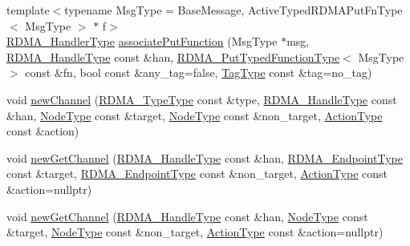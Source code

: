 \begin{DoxyCompactItemize}
\item 
{\footnotesize template$<$typename Msg\+Type  = Base\+Message, Active\+Typed\+R\+D\+M\+A\+Put\+Fn\+Type$<$ Msg\+Type $>$ $\ast$ f$>$ }\\\hyperlink{namespacevt_a9530efb893c0f3846e8ac5f0507e0f49}{R\+D\+M\+A\+\_\+\+Handler\+Type} \hyperlink{structvt_1_1rdma_1_1_r_d_m_a_manager_a5092afb73c1a6fb69cb211f23eb704cb}{associate\+Put\+Function} (Msg\+Type $\ast$msg, \hyperlink{namespacevt_a10442579ec4e7ebef223818e64bcf908}{R\+D\+M\+A\+\_\+\+Handle\+Type} const \&han, \hyperlink{structvt_1_1rdma_1_1_r_d_m_a_manager_ad9746ec3367968e16945ef88c1ac45ce}{R\+D\+M\+A\+\_\+\+Put\+Typed\+Function\+Type}$<$ Msg\+Type $>$ const \&fn, bool const \&any\+\_\+tag=false, \hyperlink{namespacevt_a84ab281dae04a52a4b243d6bf62d0e52}{Tag\+Type} const \&tag=no\+\_\+tag)
\item 
void \hyperlink{structvt_1_1rdma_1_1_r_d_m_a_manager_add2a57acf8b38758b2e53f71d92d452a}{new\+Channel} (\hyperlink{namespacevt_1_1rdma_ac848e1d9da43db6294bd06f83e5d3946}{R\+D\+M\+A\+\_\+\+Type\+Type} const \&type, \hyperlink{namespacevt_a10442579ec4e7ebef223818e64bcf908}{R\+D\+M\+A\+\_\+\+Handle\+Type} const \&han, \hyperlink{namespacevt_a866da9d0efc19c0a1ce79e9e492f47e2}{Node\+Type} const \&target, \hyperlink{namespacevt_a866da9d0efc19c0a1ce79e9e492f47e2}{Node\+Type} const \&non\+\_\+target, \hyperlink{namespacevt_ae0a5a7b18cc99d7b732cb4d44f46b0f3}{Action\+Type} const \&action)
\item 
void \hyperlink{structvt_1_1rdma_1_1_r_d_m_a_manager_af300aa329bab5b4fe851025525659454}{new\+Get\+Channel} (\hyperlink{namespacevt_a10442579ec4e7ebef223818e64bcf908}{R\+D\+M\+A\+\_\+\+Handle\+Type} const \&han, \hyperlink{structvt_1_1rdma_1_1_r_d_m_a_manager_a106350721a187d2cfb94a9017ef66a07}{R\+D\+M\+A\+\_\+\+Endpoint\+Type} const \&target, \hyperlink{structvt_1_1rdma_1_1_r_d_m_a_manager_a106350721a187d2cfb94a9017ef66a07}{R\+D\+M\+A\+\_\+\+Endpoint\+Type} const \&non\+\_\+target, \hyperlink{namespacevt_ae0a5a7b18cc99d7b732cb4d44f46b0f3}{Action\+Type} const \&action=nullptr)
\item 
void \hyperlink{structvt_1_1rdma_1_1_r_d_m_a_manager_a6a3ecf9512915681304ccd0126ec531f}{new\+Get\+Channel} (\hyperlink{namespacevt_a10442579ec4e7ebef223818e64bcf908}{R\+D\+M\+A\+\_\+\+Handle\+Type} const \&han, \hyperlink{namespacevt_a866da9d0efc19c0a1ce79e9e492f47e2}{Node\+Type} const \&target, \hyperlink{namespacevt_a866da9d0efc19c0a1ce79e9e492f47e2}{Node\+Type} const \&non\+\_\+target, \hyperlink{namespacevt_ae0a5a7b18cc99d7b732cb4d44f46b0f3}{Action\+Type} const \&action=nullptr)

\end{DoxyCompactItemize}
